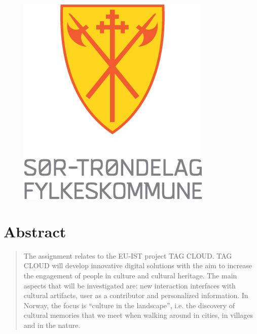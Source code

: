 \documentclass[11pt]{book}
\begin{document}
\begin{titlepage}
\begin{center}
\begin{figure}[hb]
            \hspace{0.5cm}
            \begin{minipage}[b]{0.35\linewidth}
                \centering
                \includegraphics[width=\textwidth]{images/stfk}
            \end{minipage}
        \end{figure}
        \vfill
        
    \end{center}
        
\end{titlepage}



\chapter{Abstract}
\begin{quotation}\noindent
The assignment relates to the EU-IST project TAG CLOUD. TAG CLOUD will develop innovative digital solutions with the aim to increase the engagement of people in culture and cultural heritage. The main aspects that will be investigated are: new interaction interfaces with cultural artifacts, user as a contributor and personalized information. In Norway, the focus is ``culture in the landscape'', i.e. the discovery of cultural memories that we meet when walking around in cities, in villages and in the nature.  \cite[p. 47]{compendium}
\end{quotation}
\end{document}
